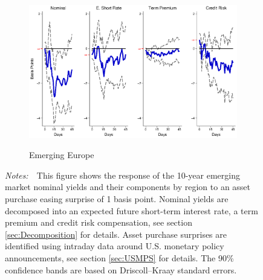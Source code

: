 \documentclass[a4paper, 12pt]{article}
\newcommand{\figtext}[1]{
	\vspace{-1ex}
	\captionsetup{justification=justified,font=footnotesize}
	\caption*{#1}
}
\newcommand{\fignotes}[1]{\figtext{\emph{Notes:~}~#1}}
\begin{document}
\begin{appendices}
\begin{landscape}
\begin{figure}[tbph]
\begin{center}
\begin{minipage}{\linewidth}
\begin{center}
						\begin{subfigure}[t]{\linewidth}
							\includegraphics[trim={0cm 0cm 0cm 0cm},clip,height=0.35\textheight,width=\linewidth]{../Figures/LSAPEEnomyptpphi120m.eps} \\
							\vspace{-0.35cm}
							\caption{Emerging Europe} \label{subfig:LPEE10Ylsap}
						\end{subfigure}
						\vspace{-0.45cm}
					\end{center}
					\fignotes{This figure shows the response of the 10-year emerging market nominal yields and their components by region to an asset purchase easing surprise of 1 basis point. Nominal yields are decomposed into an expected future short-term interest rate, a term premium and credit risk compensation, see section \ref{sec:Decomposition} for details. Asset purchase surprises are identified using intraday data around U.S. monetary policy announcements, see section \ref{sec:USMPS} for details. The 90\% confidence bands are based on Driscoll--Kraay standard errors.}
				\end{minipage}
			\end{center}
		\end{figure}
		
		\pagebreak[4]
		

\end{landscape}
\end{appendices}
\end{document}
